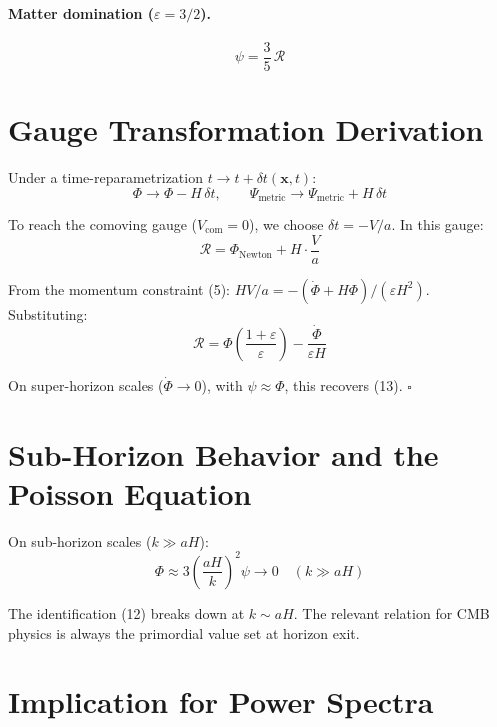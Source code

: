 \documentclass[12pt,a4paper]{article}
\begin{document}
\paragraph{Matter domination ($\varepsilon = 3/2$).}
\begin{equation}
\psi = \frac{3}{5}\,\mathcal{R} \tag{16}
\end{equation}

\section{Gauge Transformation Derivation}

Under a time-reparametrization $t \to t + \delta t(\mathbf{x}, t)$:
\begin{equation}
\Phi \to \Phi - H\,\delta t, \qquad \Psi_\text{metric} \to \Psi_\text{metric} + H\,\delta t \tag{17}
\end{equation}

To reach the comoving gauge ($V_\text{com} = 0$), we choose $\delta t = -V/a$. In this gauge:
\begin{equation}
\mathcal{R} = \Phi_\text{Newton} + H \cdot \frac{V}{a} \tag{18}
\end{equation}

From the momentum constraint (5): $HV/a = -(\dot{\Phi} + H\Phi)/(\varepsilon H^2)$. Substituting:
\begin{equation}
\mathcal{R} = \Phi\left(\frac{1+\varepsilon}{\varepsilon}\right) - \frac{\dot{\Phi}}{\varepsilon H} \tag{19}
\end{equation}

On super-horizon scales ($\dot{\Phi} \to 0$), with $\psi \approx \Phi$, this recovers (13). $\square$

\section{Sub-Horizon Behavior and the Poisson Equation}

On sub-horizon scales ($k \gg aH$):
\begin{equation}
\Phi \approx 3\left(\frac{aH}{k}\right)^2 \psi \to 0 \quad (k \gg aH) \tag{20}
\end{equation}

The identification (12) breaks down at $k \sim aH$. The relevant relation for CMB physics is always the primordial value set at horizon exit.

\section{Implication for Power Spectra}
\end{document}
